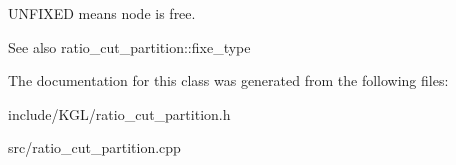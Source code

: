 {\ttfamily U\+N\+F\+I\+X\+ED} means node is free.

\begin{DoxySeeAlso}{See also}
ratio\+\_\+cut\+\_\+partition\+::fixe\+\_\+type 
\end{DoxySeeAlso}


The documentation for this class was generated from the following files\+:\begin{DoxyCompactItemize}
\item 
include/\+K\+G\+L/ratio\+\_\+cut\+\_\+partition.\+h\item 
src/ratio\+\_\+cut\+\_\+partition.\+cpp\end{DoxyCompactItemize}
